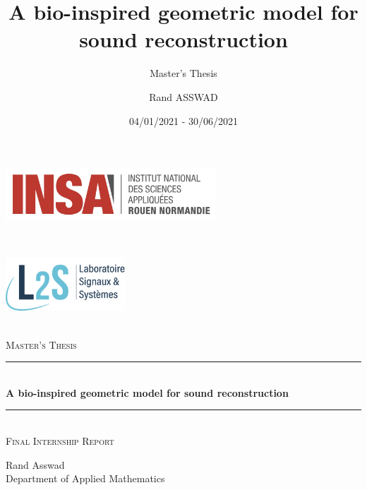 \documentclass[
  american,
]{article}
\title{A bio-inspired geometric model for sound reconstruction}
\subtitle{Master's Thesis}
\author{Rand ASSWAD}
\date{04/01/2021 - 30/06/2021}
\newcommand{\HRule}{\rule{\linewidth}{0.5mm}}
\begin{document}
\maketitle

\begin{titlepage}
    \begin{sffamily}
        \begin{center}
            \begin{minipage}[c]{0.45\textwidth}
            \raggedright\includegraphics[height=2cm]{img/logo_insa.png}
            \end{minipage}~\hfill~%
            \begin{minipage}[c]{0.45\textwidth}
            \raggedleft\includegraphics[height=2cm]{img/logo_l2s.png}
            \end{minipage}\\[2cm]

            \textsc{\huge Master's Thesis}\\[1cm]

            \HRule \\[0.4cm]
            {\huge \bfseries A bio-inspired geometric model for sound reconstruction \\[0.4cm]}
            \HRule \\[1cm]
            
            \textsc{\huge Final Internship Report}\\[1cm]

            \vfill

            \begin{minipage}{\textwidth}
            \begin{center}\Large
                Rand Asswad\\
                Department of Applied Mathematics
            \end{center}
            \end{minipage} \\[2cm]


\end{center}
\end{sffamily}
\end{titlepage}
\end{document}
